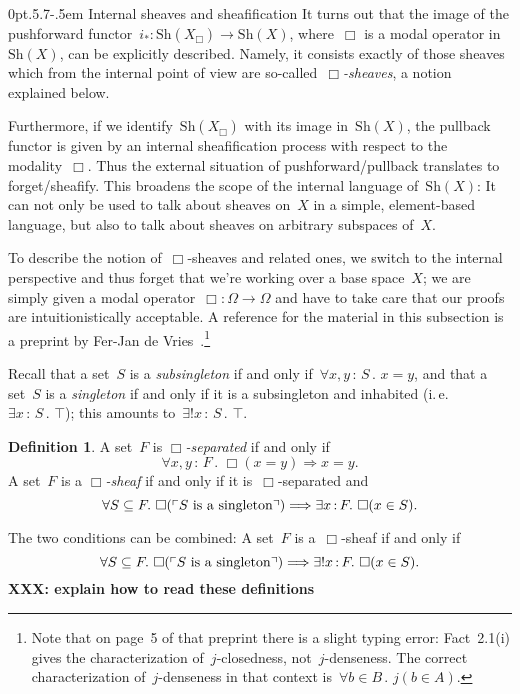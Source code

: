 \documentclass[10pt,reqno,a4paper]{amsbook}
\makeatletter
\theoremstyle{definition}
\newtheorem{defn}{Definition}[section]
\theoremstyle{plain}
\theoremstyle{remark}
\newcommand{\Sh}{\mathrm{Sh}}
\newcommand{\?}{\,{:}\,}
\renewcommand{\_}{\mathpunct{.}\,}
\newcommand{\speak}[1]{\ulcorner\text{\textnormal{#1}}\urcorner}
\newcommand{\ie}{i.\,e.\@\xspace}
\newcommand{\XXX}[1]{\textbf{XXX: #1}}
\def\subsection{\@startsection{subsection}{2}%
  {0pt}{.5\linespacing\@plus.7\linespacing}{-.5em}%
  {\normalfont\bfseries}}
\makeatother
\begin{document}
\subsection{Internal sheaves and sheafification}\label{sect:internal-sheaves}
It turns out that the image of
the pushforward functor~$i_* : \Sh(X_\Box) \to \Sh(X)$, where~$\Box$ is a modal
operator in~$\Sh(X)$, can be explicitly described. Namely, it consists exactly
of those sheaves which from the internal point of view
are so-called~\emph{$\Box$-sheaves}, a notion explained below.

Furthermore, if we identify~$\Sh(X_\Box)$ with its image in~$\Sh(X)$, the
pullback functor is given by an internal sheafification process with respect to
the modality~$\Box$. Thus the external situation of pushforward/pullback
translates to forget/sheafify. This broadens the scope of the internal
language of~$\Sh(X)$: It can not only be used to talk about sheaves on~$X$ in a simple,
element-based language, but also to talk about sheaves on arbitrary subspaces
of~$X$.

To describe the notion of~$\Box$-sheaves and related ones, we switch to the internal
perspective and thus forget that we're working over a base space~$X$; we are simply given a modal operator~$\Box :
\Omega \to \Omega$ and have to take care that our proofs are intuitionistically acceptable. A
reference for the material in this subsection is a preprint by Fer-Jan de
Vries~\cite{vries:sheafification}.\footnote{Note that on page~5 of that
preprint there is a slight typing error: Fact~2.1(i) gives the
characterization of~$j$-closedness, not~$j$-denseness. The correct
characterization of~$j$-denseness in that context is~$\forall b \in B\_ j(b \in
A)$.}

Recall that a set~$S$ is a \emph{subsingleton} if and only if~$\forall x,y\?S\_
x = y$, and that a set~$S$ is a \emph{singleton} if and only if it is a subsingleton and
inhabited (\ie~$\exists x\?S\_ \top$); this amounts to~$\exists!x\?S\_ \top$.

\begin{defn}\label{defn:box-sheaves}
A set~$F$ is \emph{$\Box$-separated} if and only if
\[ \forall x,y\?F\_ \Box(x = y) \Longrightarrow x = y. \]
A set~$F$ is a \emph{$\Box$-sheaf} if and only if it is~$\Box$-separated and
\[ \forall S \subseteq F\_
  \Box(\speak{$S$ is a singleton}) \Longrightarrow
  \exists x\?F\_ \Box(x \in S). \]
\end{defn}

The two conditions can be combined: A set~$F$ is a~$\Box$-sheaf if and only if
\[ \forall S \subseteq F\_
  \Box(\speak{$S$ is a singleton}) \Longrightarrow
  \exists! x\?F\_ \Box(x \in S). \]
\XXX{explain how to read these definitions}
\end{document}
